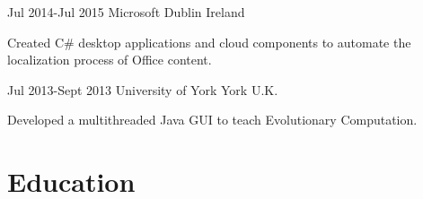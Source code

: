\documentclass[10pt]{CurriculumVitae}
\begin{document}
      {Jul 2014-Jul 2015}
      {Microsoft} 
      {Dublin}
      {Ireland}
      {
        \item Created C\# desktop applications and cloud components to automate the localization process of Office content.
      }
    
      {Jul 2013-Sept 2013}
      {University of York}
      {York}
      {U.K.}
      {
        \item Developed a multithreaded Java GUI to teach Evolutionary Computation.
      } 


  \section{Education}
   
\end{document}
